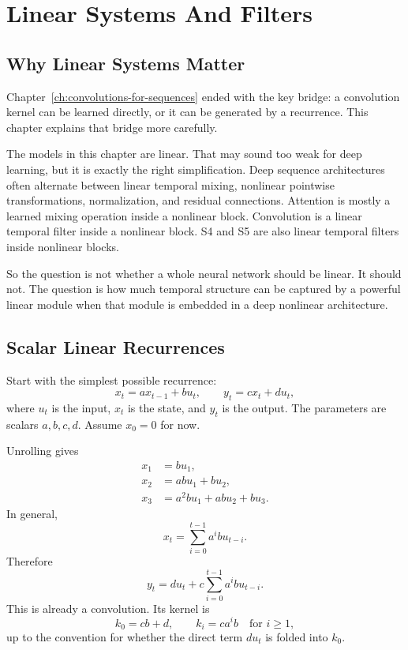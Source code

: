 \chapter{Linear Systems And Filters}
\label{ch:linear-systems-and-filters}

\section{Why Linear Systems Matter}

Chapter~\ref{ch:convolutions-for-sequences} ended with the key bridge:
a convolution kernel can be learned directly, or it can be generated by a recurrence.
This chapter explains that bridge more carefully.

The models in this chapter are linear. That may sound too weak for deep learning, but it
is exactly the right simplification. Deep sequence architectures often alternate between
linear temporal mixing, nonlinear pointwise transformations, normalization, and residual
connections. Attention is mostly a learned mixing operation inside a nonlinear block.
Convolution is a linear temporal filter inside a nonlinear block. S4 and S5 are also
linear temporal filters inside nonlinear blocks.

So the question is not whether a whole neural network should be linear. It should not.
The question is how much temporal structure can be captured by a powerful linear module
when that module is embedded in a deep nonlinear architecture.

\section{Scalar Linear Recurrences}

Start with the simplest possible recurrence:
\begin{equation}
  x_t = a x_{t-1} + b u_t,
  \qquad
  y_t = c x_t + d u_t,
  \label{eq:scalar-linear-recurrence}
\end{equation}
where $u_t$ is the input, $x_t$ is the state, and $y_t$ is the output. The parameters are
scalars $a,b,c,d$. Assume $x_0=0$ for now.

Unrolling gives
\[
\begin{aligned}
  x_1 &= b u_1, \\
  x_2 &= a b u_1 + b u_2, \\
  x_3 &= a^2 b u_1 + a b u_2 + b u_3.
\end{aligned}
\]
In general,
\[
  x_t = \sum_{i=0}^{t-1} a^i b u_{t-i}.
\]
Therefore
\[
  y_t
  =
  d u_t
  +
  c \sum_{i=0}^{t-1} a^i b u_{t-i}.
\]
This is already a convolution. Its kernel is
\[
  k_0 = cb + d,
  \qquad
  k_i = c a^i b \quad \text{for } i \geq 1,
\]
up to the convention for whether the direct term $d u_t$ is folded into $k_0$.

